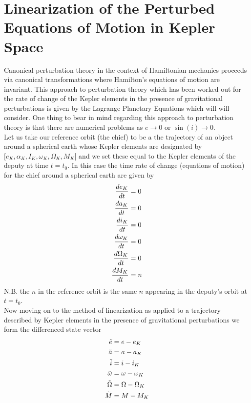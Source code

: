\section{Linearization of the Perturbed Equations of Motion in Kepler Space}

Canonical perturbation theory in the context of Hamiltonian mechanics proceeds via canonical transformations where Hamilton's equations of motion are invariant. 
This approach to perturbation theory which has been worked out for the rate of change of the Kepler elements in the presence of gravitational perturbations is
given by the Lagrange Planetary Equations which will will consider. One thing to bear in mind regarding this approach to perturbation theory is that there are numerical problems as $e\rightarrow 0$ or $\sin(i) \rightarrow 0$.\\

Let us take our reference orbit (the chief) to be a the trajectory of an object around a spherical earth whose Kepler elements are designated by
$[e_K,\alpha_K,I_K,\omega_K,\Omega_K,M_K[$ and we set these equal to the Kepler elements of the deputy at time $t = t_0$. In this case the time rate of change (equations of motion)
for the chief around a spherical earth are given by 
\begin{align*}
{de_K\over dt}  &= 0\\
{da_K\over dt}  &= 0\\
{di_K\over dt}  &= 0\\
{d\omega_K\over dt}  &= 0\\
{d\Omega_K\over dt}  &= 0\\
{dM_K\over dt} &= n\\
\end{align*}N.B. the $n$ in the reference orbit is the same $n$ appearing in the deputy's orbit at $t=t_0$. \\

Now moving on to the method of linearization as applied to a trajectory described by Kepler elements in the presence of gravitational perturbations we form the differenced state vector
\begin{align*}
\tilde e &= e - e_K\\
\tilde a &= a - a_K\\
\tilde i  &=  i - i_K\\
\tilde \omega &= \omega - \omega_K\\
\tilde \Omega &= \Omega - \Omega_K\\
\tilde M &= M - M_K\\
\end{align*}\\

